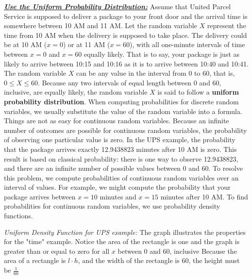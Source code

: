 \documentclass{report}
\begin{document}
      \pagebreak \bigbreak \noindent 
      \textbf{\textit{\underline{Use the Uniform Probability Distribution:}}}
      \bigbreak \noindent 
      Assume that United Parcel Service is supposed to deliver a package to your front door and the arrival time is somewhere between 10 AM and 11 AM. Let the random variable $X$ represent the time from 10 AM when the delivery is supposed to take place.
      \bigbreak \noindent 
    The delivery could be at 10 AM ($x=0$) or at 11 AM ($x=60$), with all one-minute intervals of time between $x=0$ and $x=60$ equally likely. That is to say, your package is just as likely to arrive between 10:15 and 10:16 as it is to arrive between 10:40 and 10:41.
    \bigbreak \noindent 
    The random variable $X$ can be any value in the interval from 0 to 60, that is, $0 \leq X \leq 60$. Because any two intervals of equal length between 0 and 60, inclusive, are equally likely, the random variable $X$ is said to follow a \textbf{uniform probability distribution}.
    \bigbreak \noindent 
    When computing probabilities for discrete random variables, we usually substitute the value of the random variable into a formula.
    \bigbreak \noindent 
    Things are not as easy for continuous random variables. Because an infinite number of outcomes are possible for continuous random variables, the probability of observing one particular value is zero. In the UPS example, the probability that the package arrives exactly 12.9438823 minutes after 10 AM is zero. This result is based on classical probability: there is one way to observe 12.9438823, and there are an infinite number of possible values between 0 and 60. To resolve this problem, we compute probabilities of continuous random variables over an interval of values. For example, we might compute the probability that your package arrives between $x=10$ minutes and $x=15$ minutes after 10 AM. To find probabilities for continuous random variables, we use probability density functions. 

    \bigbreak \noindent 
    \textit{Uniform Density Function for UPS example:}
    \bigbreak \noindent 
    The graph illustrates the properties for the "time" example. Notice the area of the rectangle is one and the graph is greater than or equal to zero for all $x $ between 0 and 60, inclusive
    \bigbreak \noindent 
    Because the area of a rectangle is $l\cdot h $, and the width of the rectangle is 60, the height must be $\frac{1}{60}$
    \bigbreak \noindent 
\end{document}

